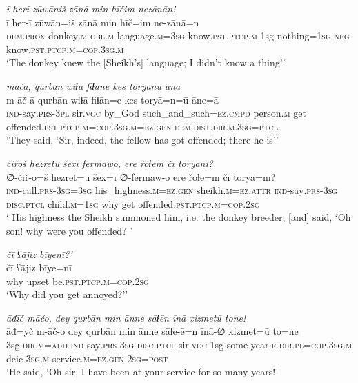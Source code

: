 \ea \label{HB.71}
\textit{ī herī zūwāniš zānā min hīčim nezānān!} \\ 
\gll ī her-ī zūwān=iš zānā min hīč=im ne-zānā=n \\ 
 \textsc{dem.prox} donkey\textsc{.m}\textsc{-obl}\textsc{.m} language\textsc{.m}\textsc{=3sg} know\textsc{.pst}\textsc{.ptcp}\textsc{.m} 1sg nothing\textsc{=1sg} \textsc{neg-}know\textsc{.pst}\textsc{.ptcp}\textsc{.m}\textsc{=cop}\textsc{.3sg}\textsc{.m} \\ 
\glt `The donkey knew the [Sheikh’s] language; I didn’t know a thing!'
\z 
 
\ea \label{HB.76}
\textit{māčā, qurbān wiɫā fiɫāne kes toryānū ānā} \\ 
\gll m-āč-ā qurbān wiɫā fiɫān=e kes toryā=n=ū āne=ā \\ 
 \textsc{ind-}say\textsc{.prs}\textsc{-3pl} sir.\textsc{voc} by\_God such\_and\_such\textsc{=ez}\textsc{.cmpd} person\textsc{.m} get offended\textsc{.pst}\textsc{.ptcp}\textsc{.m}\textsc{=cop}\textsc{.3sg}\textsc{.m}\textsc{=ez}\textsc{.gen} \textsc{dem.dist}\textsc{.dir}\textsc{.m}\textsc{.3sg}=\textsc{ptcl} \\ 
\glt `They said, ‘Sir, indeed, the fellow has got offended; there he is’'
\z 
 
\ea \label{HB.80}
\textit{čiřoš hezretū šēxī fermāwo, erē řoɫem čī toryānī?} \\ 
\gll ∅-čiř-o=š hezret=ū šēx=ī ∅-fermāw-o erē řoɫe=m čī toryā=nī? \\ 
 \textsc{ind-}call\textsc{.prs}\textsc{-3sg}\textsc{=3sg} his\_highness\textsc{.m}\textsc{=ez}\textsc{.gen} sheikh\textsc{.m}\textsc{=ez}.\textsc{attr} \textsc{ind-}say\textsc{.prs}\textsc{-3sg} \textsc{disc.ptcl} child\textsc{.m}\textsc{=1sg} why get offended\textsc{.pst}\textsc{.ptcp}\textsc{.m}\textsc{=cop}\textsc{.\textsc{2sg}} \\ 
\glt ` His highness the Sheikh summoned him, i.e. the donkey breeder, [and] said, ‘Oh son! why were you offended? '
\z 
 
\ea \label{HB.81}
\textit{čī ʕājiz bīyenī?’} \\ 
\gll čī ʕājiz bīye=nī \\ 
 why upset be\textsc{.pst}\textsc{.ptcp}\textsc{.m}\textsc{=cop}\textsc{.\textsc{2sg}} \\ 
\glt `Why did you get annoyed?’'
\z 
 
\ea \label{HB.82}
\textit{āđīč māčo, dey qurbān min ānne sāɫēn īnā xizmetū tone!} \\ 
\gll āđ=yč m-āč-o dey qurbān min ānne sāɫe-ē=n īnā-∅ xizmet=ū to=ne \\ 
 3sg\textsc{.dir}\textsc{.m}\textsc{=add} \textsc{ind-}say\textsc{.prs}\textsc{-3sg} \textsc{disc.ptcl} sir.\textsc{voc} 1sg some year\textsc{\textsc{.f}}\textsc{-dir}\textsc{.pl}\textsc{=cop}\textsc{.3sg}\textsc{.m} deic\textsc{-3sg}\textsc{.m} service\textsc{.m}\textsc{=ez}\textsc{.gen} \textsc{2sg}\textsc{=\textsc{post}} \\ 
\glt `He said, ‘Oh sir, I have been at your service for so many years!'
\z 
 
